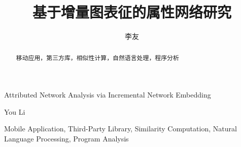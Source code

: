 \documentclass{sysuthesis} %
\numberwithin{algorithm}{chapter}
\theoremstyle{plain}
\theoremstyle{definition}
\theoremstyle{definition}
\begin{document}
\title{基于增量图表征的属性网络研究}{}{Attributed Network Analysis via Incremental Network Embedding}{}

\author{李友}{You Li}




\maketitle

\begin{abstract}{移动应用，第三方库，相似性计算，自然语言处理，程序分析}
  
\end{abstract}

\begin{englishabstract}{Mobile Application, Third-Party Library, Similarity Computation, Natural Language Processing, Program Analysis}
  
\end{englishabstract}

\tableofcontents


\begin{Main} %










%

%

\end{Main} %






\newpage
\printindex %
\end{document}
